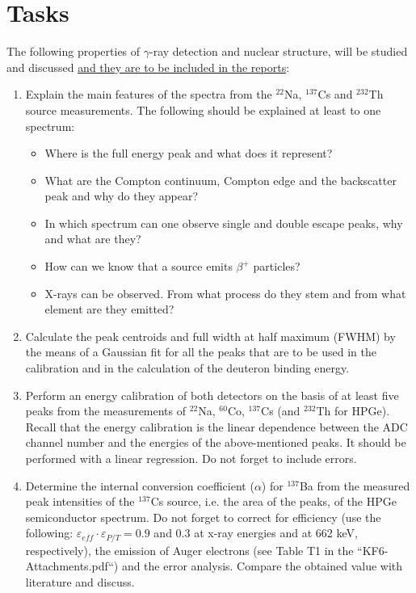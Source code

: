 \documentclass[12pt]{article}
\begin{document}
\section*{Tasks}
The following properties of $\gamma$-ray detection and nuclear structure, will be studied and discussed \underline{and they are to be included in the reports}:
\begin{enumerate}
  \item Explain the main features of the spectra from the $^{22}$Na, $^{137}$Cs and $^{232}$Th source measurements. The following should be explained at least to one spectrum:
    \begin{itemize}
      \item Where is the full energy peak and what does it represent?
      \item What are the Compton continuum, Compton edge and the backscatter peak and why do they appear?
      \item In which spectrum can one observe single and double escape peaks, why and what are they?
      \item How can we know that a source emits $\beta^{+}$ particles?
      \item X-rays can be observed. From what process do they stem and from what element are they emitted?
    \end{itemize}
  \item Calculate the peak centroids and full width at half maximum (FWHM) by the means of a Gaussian fit for all the peaks that are to be used in the calibration and in the calculation of the deuteron binding energy.
  \item Perform an energy calibration of both detectors on the basis of at least five peaks from the measurements of $^{22}$Na, $^{60}$Co, $^{137}$Cs (and $^{232}$Th for HPGe). Recall that the energy calibration is the linear dependence between the ADC channel number and the energies of the above-mentioned peaks. It should be performed with a linear regression. Do not forget to include errors.
  \item Determine the internal conversion coefficient ($\alpha$) for $^{137}$Ba from the measured peak intensities of the $^{137}$Cs source, i.e. the area of the peaks, of the HPGe semiconductor spectrum. Do not forget to correct for efficiency (use the following: $\varepsilon_{eff} \cdot \varepsilon_{P/T} = 0.9$ and 0.3 at x-ray energies and at 662 keV, respectively), the emission of Auger electrons (see Table T1 in the ``KF6-Attachments.pdf``) and the error analysis. Compare the obtained value with literature and discuss.

\end{enumerate}
\end{document}
